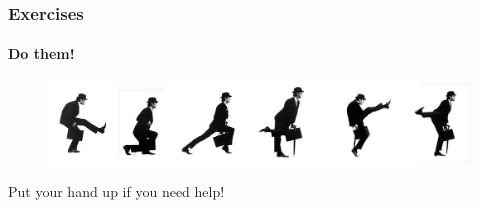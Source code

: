 \documentclass{beamer}
\begin{document}
\begin{frame}


\frametitle{Exercises}
\framesubtitle{Do them!}
\huge
\begin{figure}
\includegraphics[scale=0.3]{Ministry_of_Silly_walks_2012.jpg}
\end{figure}
 \vfill

\centering Put your hand up if you need help!

\end{frame}
\end{document}
